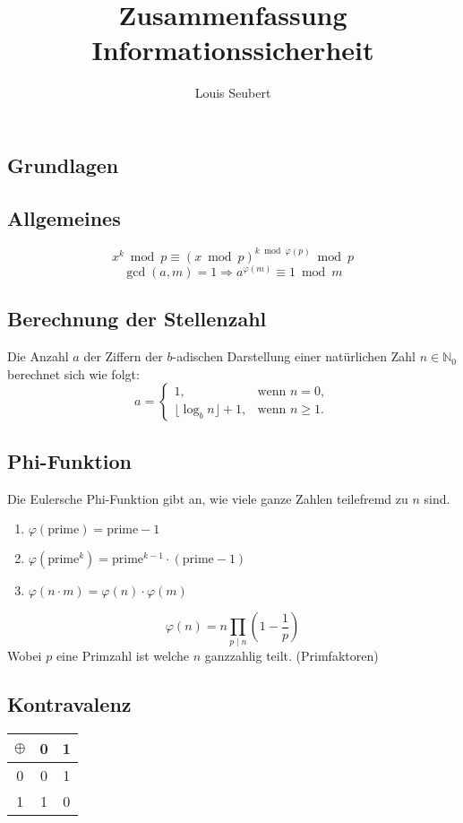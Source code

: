 \documentclass[8pt,a4paper,landscape]{article}
\title{Zusammenfassung Informationssicherheit}
\author{Louis Seubert}
\newcommand{\No}{\ensuremath{\mathbb{N}_0}}
\begin{document}
\begin{multicols*}{4}
  \section{Grundlagen}
  \subsection*{Allgemeines}
  \[
   x^{k} \bmod p \equiv \left( x \bmod p \right)^{k \bmod \varphi(p)} \bmod p
  \]
  \[
   \gcd(a,m) = 1 \Rightarrow a^{\varphi(m)} \equiv 1 \bmod m
  \]
  \subsection*{Berechnung der Stellenzahl}
  Die Anzahl $a$ der Ziffern der $b$-adischen Darstellung einer natürlichen Zahl
  $n \in \No$ berechnet sich wie folgt:
  \[
   a =
    \begin{cases}
    1, & \text{wenn } n = 0,\\
    \lfloor \log_b{n} \rfloor + 1, & \text{wenn } n \geq 1.
    \end{cases}
  \]

  \subsection{Phi-Funktion}
  Die Eulersche Phi-Funktion gibt an, wie viele ganze Zahlen teilefremd zu $n$ sind.
  \begin{enumerate}
    \item $\varphi(\text{prime}) = \text{prime} - 1$
    \item $\varphi(\text{prime}^k) = \text{prime}^{k-1} \cdot (\text{prime}-1)$
    \item $\varphi(n \cdot m) = \varphi(n) \cdot \varphi(m)$
  \end{enumerate}
  \[
    \varphi(n) = n \prod_{p \mid n} \left( 1 - \frac{1}{p} \right)
  \]
  Wobei $p$ eine Primzahl ist welche $n$ ganzzahlig teilt. (Primfaktoren)

  \subsection{Kontravalenz}
  \begin{center}
    \begin{tabular}{c| c c }
      $\oplus$ & 0 & 1 \\ \hline
      0        & 0 & 1 \\
      1        & 1 & 0
    \end{tabular}
  \end{center}
  

\end{multicols*}
\end{document}
